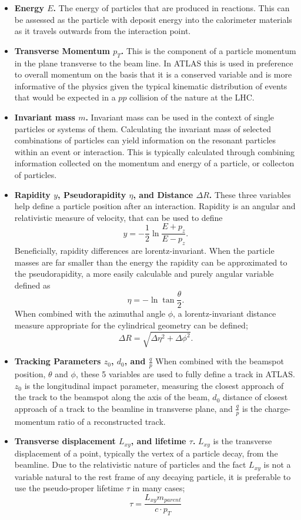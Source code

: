 \begin{itemize}
    \item \textbf{Energy $E$.} The energy of particles that are produced in reactions. This can be assessed as the particle with deposit energy into the calorimeter materials as it travels outwards from the interaction point.
    \item \textbf{Transverse Momentum $p_{T}$.} This is the component of a particle momentum in the plane transverse to the beam line. In ATLAS this is used in preference to overall momentum on the basis that it is a conserved variable and is more informative of the physics given the typical kinematic distribution of events that would be expected in a $pp$ collision of the nature at the LHC.
    \item \textbf{Invariant mass $m$.} Invariant mass can be used in the context of single particles or systems of them. Calculating the invariant mass of selected combinations of particles can yield information on the resonant particles within an event or interaction. This is typically calculated through combining information collected on the momentum and energy of a particle, or collecton of particles.
    \item \textbf{ Rapidity $y$, Pseudorapidity $\eta$, and Distance $\Delta R$.} These three variables help define a particle position after an interaction. Rapidity is an angular and relativistic measure of velocity, that can be used to define $$y = -\frac{1}{2} \ln{\frac{E+p_{z}}{E-{p_{z}}} }.$$ Beneficially, rapidity differences are lorentz-invariant. When the particle masses are far smaller than the energy the rapidity can be approximated to the pseudorapidity, a more easily calculable and purely angular variable defined as $$\eta = -\ln\tan{\frac{\theta}{2}}.$$ When combined with the azimuthal angle $\phi$, a lorentz-invariant distance measure appropriate for the cylindrical geometry can be defined; $$\Delta R = \sqrt{\Delta \eta^{2} + \Delta \phi^{2}}.$$
    \item \textbf{ Tracking Parameters $z_{0}$, $d_{0}$, and $\frac{q}{p}$ } When combined with the beamspot position, $\theta$ and $\phi$, these 5 variables are used to fully define a track in ATLAS. $z_{0}$ is the longitudinal impact parameter, measuring the closest approach of the track to the beamspot along the axis of the beam, $d_{0}$ distance of closest approach of a track to the beamline in transverse plane, and $\frac{q}{p}$ is the charge-momentum ratio of a reconstructed track.
    \item \textbf{ Transverse displacement $L_{xy}$, and lifetime $\tau$.} $L_{xy}$ is the transverse displacement of a point, typically the vertex of a particle decay, from the beamline. Due to the relativistic nature of particles and the fact $L_{xy}$ is not a variable natural to the rest frame of any decaying particle, it is preferable to use the pseudo-proper lifetime $\tau$ in many cases; $$ \tau = \frac{L_{xy}m_{parent}}{c\cdot p_{T}} $$



\end{itemize}
    
